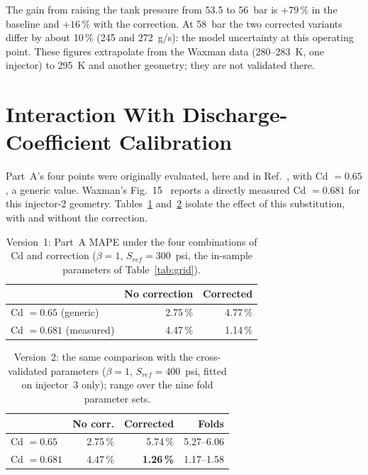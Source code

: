\documentclass[11pt,a4paper]{article}
\begin{document}
The gain from raising the tank pressure from 53.5 to 56~bar is $+79\,\%$ in the baseline and $+16\,\%$ with the correction. At 58~bar the two corrected variants differ by about 10\,\% (245 and 272~g/s): the model uncertainty at this operating point. These figures extrapolate from the Waxman data (280--283~K, one injector) to 295~K and another geometry; they are not validated there.

\section{Interaction With Discharge-Coefficient Calibration}\label{sec:cd}
Part~A's four points were originally evaluated, here and in Ref.~\cite{nino2019}, with Cd $=0.65$, a generic value. Waxman's Fig.~15~\cite{waxman2013} reports a directly measured Cd $=0.681$ for this injector-2 geometry. Tables~\ref{tab:partA1} and~\ref{tab:partA2} isolate the effect of this substitution, with and without the correction.

\begin{table}[!htbp]
\centering\small
\caption{Version~1: Part~A MAPE under the four combinations of Cd and correction ($\beta=1$, $S_{ref}=300$~psi, the in-sample parameters of Table~\ref{tab:grid}).}
\label{tab:partA1}
\begin{tabular}{lrr}\toprule
 & No correction & Corrected\\\midrule
Cd $=0.65$ (generic) & 2.75\,\% & 4.77\,\%\\
Cd $=0.681$ (measured) & 4.47\,\% & 1.14\,\%\\\bottomrule
\end{tabular}
\end{table}

\begin{table}[!htbp]
\centering\small
\caption{Version~2: the same comparison with the cross-validated parameters ($\beta=1$, $S_{ref}=400$~psi, fitted on injector~3 only); range over the nine fold parameter sets.}
\label{tab:partA2}
\begin{tabular}{lrrr}\toprule
 & No corr. & Corrected & Folds\\\midrule
Cd $=0.65$ & 2.75\,\% & 5.74\,\% & 5.27--6.06\\
Cd $=0.681$ & 4.47\,\% & \textbf{1.26\,\%} & 1.17--1.58\\\bottomrule
\end{tabular}
\end{table}
\end{document}
